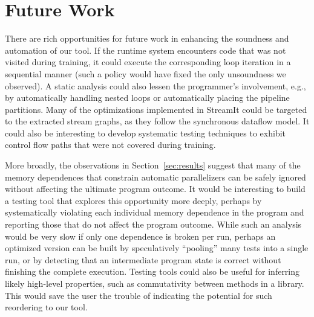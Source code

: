 
\section{Future Work}

There are rich opportunities for future work in enhancing the
soundness and automation of our tool.  If the runtime system
encounters code that was not visited during training, it could execute
the corresponding loop iteration in a sequential manner (such a policy
would have fixed the only unsoundness we observed).  A static analysis
could also lessen the programmer's involvement, e.g., by automatically
handling nested loops or automatically placing the pipeline
partitions.  Many of the optimizations implemented in StreamIt could
be targeted to the extracted stream graphs, as they follow the
synchronous dataflow model.  It could also be interesting to develop
systematic testing techniques to exhibit control flow paths that were
not covered during training.

More broadly, the observations in Section~\ref{sec:results} suggest
that many of the memory dependences that constrain automatic
parallelizers can be safely ignored without affecting the ultimate
program outcome.  It would be interesting to build a testing tool that
explores this opportunity more deeply, perhaps by systematically
violating each individual memory dependence in the program and
reporting those that do not affect the program outcome.  While such an
analysis would be very slow if only one dependence is broken per run,
perhaps an optimized version can be built by speculatively ``pooling''
many tests into a single run, or by detecting that an intermediate
program state is correct without finishing the complete execution.
Testing tools could also be useful for inferring likely high-level
properties, such as commutativity between methods in a library.  This
would save the user the trouble of indicating the potential for such
reordering to our tool.

